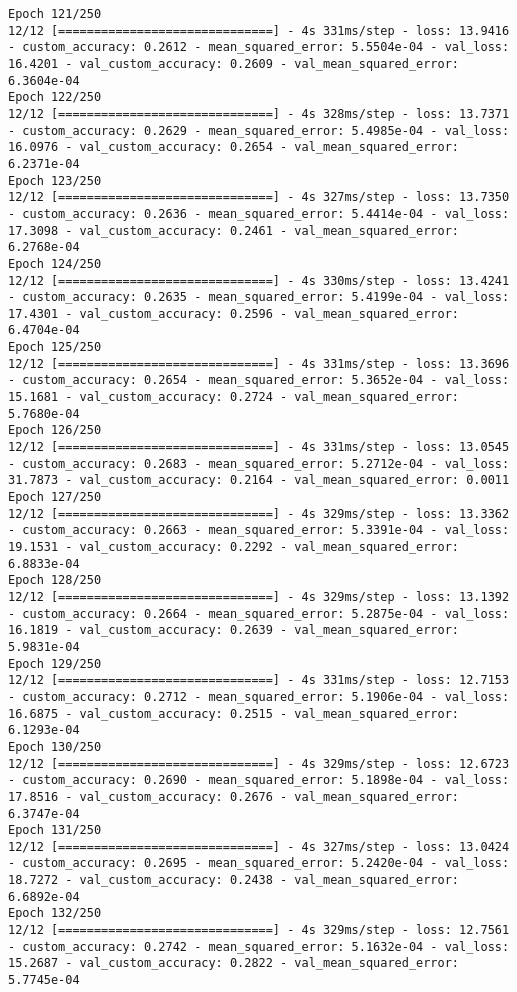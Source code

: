 \begin{lstlisting}
Epoch 121/250
12/12 [==============================] - 4s 331ms/step - loss: 13.9416 - custom_accuracy: 0.2612 - mean_squared_error: 5.5504e-04 - val_loss: 16.4201 - val_custom_accuracy: 0.2609 - val_mean_squared_error: 6.3604e-04
Epoch 122/250
12/12 [==============================] - 4s 328ms/step - loss: 13.7371 - custom_accuracy: 0.2629 - mean_squared_error: 5.4985e-04 - val_loss: 16.0976 - val_custom_accuracy: 0.2654 - val_mean_squared_error: 6.2371e-04
Epoch 123/250
12/12 [==============================] - 4s 327ms/step - loss: 13.7350 - custom_accuracy: 0.2636 - mean_squared_error: 5.4414e-04 - val_loss: 17.3098 - val_custom_accuracy: 0.2461 - val_mean_squared_error: 6.2768e-04
Epoch 124/250
12/12 [==============================] - 4s 330ms/step - loss: 13.4241 - custom_accuracy: 0.2635 - mean_squared_error: 5.4199e-04 - val_loss: 17.4301 - val_custom_accuracy: 0.2596 - val_mean_squared_error: 6.4704e-04
Epoch 125/250
12/12 [==============================] - 4s 331ms/step - loss: 13.3696 - custom_accuracy: 0.2654 - mean_squared_error: 5.3652e-04 - val_loss: 15.1681 - val_custom_accuracy: 0.2724 - val_mean_squared_error: 5.7680e-04
Epoch 126/250
12/12 [==============================] - 4s 331ms/step - loss: 13.0545 - custom_accuracy: 0.2683 - mean_squared_error: 5.2712e-04 - val_loss: 31.7873 - val_custom_accuracy: 0.2164 - val_mean_squared_error: 0.0011
Epoch 127/250
12/12 [==============================] - 4s 329ms/step - loss: 13.3362 - custom_accuracy: 0.2663 - mean_squared_error: 5.3391e-04 - val_loss: 19.1531 - val_custom_accuracy: 0.2292 - val_mean_squared_error: 6.8833e-04
Epoch 128/250
12/12 [==============================] - 4s 329ms/step - loss: 13.1392 - custom_accuracy: 0.2664 - mean_squared_error: 5.2875e-04 - val_loss: 16.1819 - val_custom_accuracy: 0.2639 - val_mean_squared_error: 5.9831e-04
Epoch 129/250
12/12 [==============================] - 4s 331ms/step - loss: 12.7153 - custom_accuracy: 0.2712 - mean_squared_error: 5.1906e-04 - val_loss: 16.6875 - val_custom_accuracy: 0.2515 - val_mean_squared_error: 6.1293e-04
Epoch 130/250
12/12 [==============================] - 4s 329ms/step - loss: 12.6723 - custom_accuracy: 0.2690 - mean_squared_error: 5.1898e-04 - val_loss: 17.8516 - val_custom_accuracy: 0.2676 - val_mean_squared_error: 6.3747e-04
Epoch 131/250
12/12 [==============================] - 4s 327ms/step - loss: 13.0424 - custom_accuracy: 0.2695 - mean_squared_error: 5.2420e-04 - val_loss: 18.7272 - val_custom_accuracy: 0.2438 - val_mean_squared_error: 6.6892e-04
Epoch 132/250
12/12 [==============================] - 4s 329ms/step - loss: 12.7561 - custom_accuracy: 0.2742 - mean_squared_error: 5.1632e-04 - val_loss: 15.2687 - val_custom_accuracy: 0.2822 - val_mean_squared_error: 5.7745e-04

\end{lstlisting}
